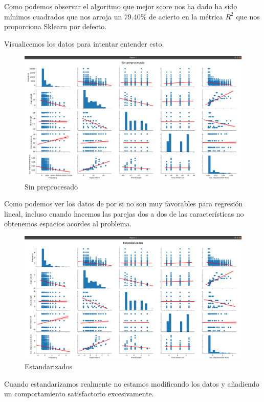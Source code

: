 \documentclass[12pt,a4paper]{article}
\begin{document}
Como podemos observar el algoritmo que mejor score nos ha dado ha sido mínimos cuadrados que nos arroja un 79.40\% de acierto en la métrica $R^2$ que nos proporciona Sklearn por defecto.

Visualicemos los datos para intentar entender esto.

\begin{figure}[H]
	\centering
	\includegraphics[scale=0.27]{./Imagenes/REG_sin_preprocesado.png}
	\caption{Sin preprocesado}
\end{figure}

Como podemos ver los datos de por si no son muy favorables para regresión lineal, incluso cuando hacemos las parejas dos a dos de las características no obtenemos espacios acordes al problema.

\begin{figure}[H]
	\centering
	\includegraphics[scale=0.27]{./Imagenes/REG_estandarizados.png}
	\caption{Estandarizados}
\end{figure}

Cuando estandarizamos realmente no estamos modificando los datos y añadiendo un comportamiento satisfactorio excesivamente.
\end{document}
